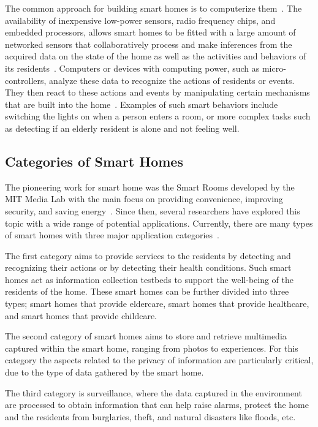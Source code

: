 The common approach for building smart homes is to computerize them~\parencite{desilvaStateArtSmart2012}. The availability of inexpensive low-power sensors, radio frequency chips, and embedded processors, allows smart homes to be fitted with a large amount of networked sensors that collaboratively process and make inferences from the acquired data on the state of the home as well as the activities and behaviors of its residents~\parencite{dingSensorTechnologySmart2011}. Computers or devices with computing power, such as micro-controllers, analyze these data to recognize the actions of residents or events. They then react to these actions and events by manipulating certain mechanisms that are built into the home~\parencite{desilvaStateArtSmart2012}. Examples of such smart behaviors include switching the lights on when a person enters a room, or more complex tasks such as detecting if an elderly resident is alone and not feeling well.

\subsection{Categories of Smart Homes}

The pioneering work for smart home was the Smart Rooms developed by the MIT Media Lab with the main focus on providing convenience, improving security, and saving energy~\parencite{pentlandSmartRooms1996,dingSensorTechnologySmart2011}. Since then, several researchers have explored this topic with a wide range of potential applications. Currently, there are many types of smart homes with three major application categories~\parencite{desilvaStateArtSmart2012}.

The first category aims to provide services to the residents by detecting and recognizing their actions or by detecting their health conditions. Such smart homes act as information collection testbeds to support the well-being of the residents of the home. These smart homes can be further divided into three types; smart homes that provide eldercare, smart homes that provide healthcare, and smart homes that provide childcare.

The second category of smart homes aims to store and retrieve multimedia captured within the smart home, ranging from photos to experiences.  For this category the aspects related to the privacy of information are particularly critical, due to the type of data gathered by the smart home.

The third category is surveillance, where the data captured in the environment are processed to obtain information that can help raise alarms, protect the home and the residents from burglaries, theft, and natural disasters like floods, etc.

